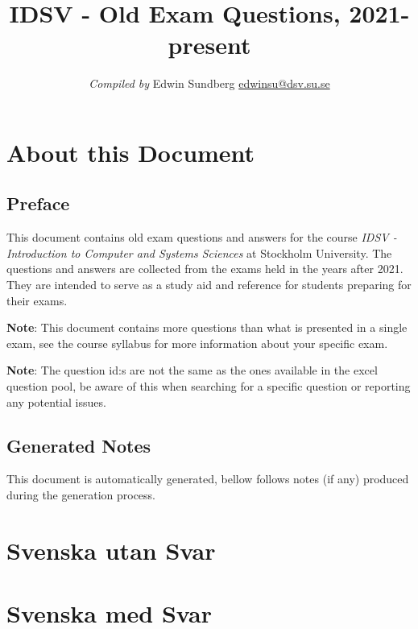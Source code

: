 \documentclass[a4paper,11pt,oneside]{book}
\title{IDSV - Old Exam Questions, 2021-present}
\author{\textit{Compiled by} Edwin Sundberg
  {\small\textcolor{darkgray}{\href{mailto:edwinsu@dsv.su.se}{edwinsu@dsv.su.se}}}}
\begin{document}
\maketitle \pagebreak

\begin{sloppypar}  

\tableofcontents \pagebreak

\chapter{About this Document}

\section{Preface}
\label{preface}
This document contains old exam questions and answers for the course \textit{IDSV - Introduction to Computer and Systems Sciences} at Stockholm University. The questions and answers are collected from the exams held in the years after 2021. They are intended to serve as a study aid and reference for students preparing for their exams.


\textbf{Note}: This document contains more questions than what is presented in a single exam, see the course syllabus for more information about your specific exam.

\textbf{Note}: The question id:s are not the same as the ones available in the excel question pool, be aware of this when searching for a specific question or reporting any potential issues.

\section{Generated Notes}
\label{generatedNotes}

This document is automatically generated, bellow follows notes (if any) produced during the generation process.



\chapter{Svenska utan Svar}
\label{svenskaUtanSvar}


\chapter{Svenska med Svar}
\label{svenska}


\end{sloppypar}
\end{document}

